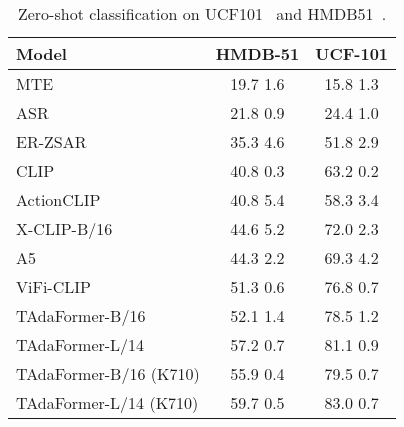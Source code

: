\documentclass[10pt,journal,compsoc]{IEEEtran}
\newcommand{\vb}{{\color{vit}{\,}}}
\newcommand{\nb}{{\color{white}{\,}}}
\newcommand{\tablestyle}[2]{\setlength{\tabcolsep}{#1}\renewcommand{\arraystretch}{#2}\centering\small}
\newcommand\graycell[0]{\cellcolor{midgrey}}
\begin{document}
\begin{table}[t]
\caption{
Zero-shot classification on UCF101~\cite{soomro2012ucf101} and HMDB51~\cite{kuehne2011hmdb}.}
\centering
\tablestyle{5.5pt}{1.0}
\begin{tabular}{lcc}
\toprule
\bf Model & HMDB-51 & UCF-101 \\
\midrule
\nb MTE~\cite{xu2016mte} & 19.7  1.6 & 15.8  1.3 \\
\nb ASR~\cite{wang2017asr} & 21.8  0.9 & 24.4  1.0 \\
\nb ER-ZSAR~\cite{chen2021er-zsar} & 35.3  4.6 & 51.8  2.9 \\
\midrule
\vb CLIP~\cite{radford2021clip} & 40.8  0.3 & 63.2  0.2 \\
\vb ActionCLIP~\cite{wang2021actionclip} & 40.8  5.4 & 58.3  3.4\\
\vb X-CLIP-B/16~\cite{ni2022xclip} & 44.6  5.2 & 72.0  2.3 \\
\vb A5~\cite{ju2022a5} & 44.3  2.2 & 69.3  4.2 \\
\vb ViFi-CLIP~\cite{rasheed2023vificlip} & 51.3  
 0.6 & 76.8  0.7 \\
\graycell\vb TAdaFormer-B/16 & \graycell52.1  1.4 & \graycell78.5  1.2\\
\graycell\vb TAdaFormer-L/14 & \graycell57.2  0.7 & \graycell81.1  0.9\\
\midrule
\graycell\vb TAdaFormer-B/16 {\footnotesize(K710)} & \graycell55.9  0.4 & \graycell79.5  0.7\\
\graycell\vb TAdaFormer-L/14 {\footnotesize(K710)} & \graycell59.7  0.5 & \graycell83.0  0.7\\
\bottomrule
\end{tabular}
\label{tab:main-zeroshot}
\end{table}
\end{document}
